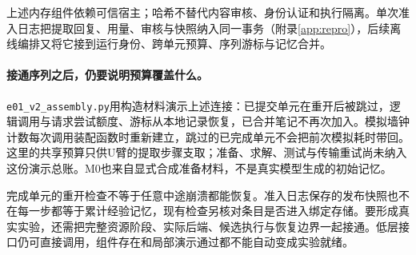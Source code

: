 上述内存组件依赖可信宿主；哈希不替代内容审核、身份认证和执行隔离。单次准入日志把提取回复、用量、审核与快照纳入同一事务（附录\ref{app:repro}），后续离线编排又将它接到运行身份、跨单元预算、序列游标与记忆合并。

\paragraph{接通序列之后，仍要说明预算覆盖什么。}
\texttt{e01\_v2\_assembly.py}用构造材料演示上述连接：已提交单元在重开后被跳过，逻辑调用与请求尝试额度、游标从本地记录恢复，已合并笔记不再次加入。模拟墙钟计数每次调用装配函数时重新建立，跳过的已完成单元不会把前次模拟耗时带回。这里的共享预算只供U臂的提取步骤支取；准备、求解、测试与传输重试尚未纳入这份演示总账。M0也来自显式合成准备材料，不是真实模型生成的初始记忆。

完成单元的重开检查不等于任意中途崩溃都能恢复。准入日志保存的发布快照也不在每一步都等于累计经验记忆，现有检查另核对条目是否进入绑定存储。要形成真实实验，还需把完整资源阶段、实际后端、候选执行与恢复边界一起接通。低层接口仍可直接调用，组件存在和局部演示通过都不能自动变成实验就绪。
